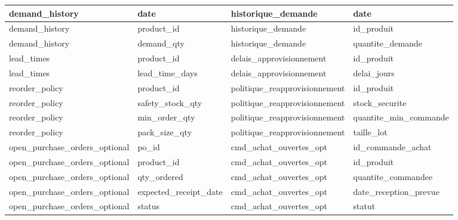 \documentclass[a4paper,11pt]{article}
\begin{document}
\begin{longtable}{|l|l|l|l|}
\rowcolor{rowgray} demand\_history & date & historique\_demande & date \\ \hline
 demand\_history & product\_id & historique\_demande & id\_produit \\ \hline
\rowcolor{rowgray} demand\_history & demand\_qty & historique\_demande & quantite\_demande \\ \hline
 lead\_times & product\_id & delais\_approvisionnement & id\_produit \\ \hline
\rowcolor{rowgray} lead\_times & lead\_time\_days & delais\_approvisionnement & delai\_jours \\ \hline
 reorder\_policy & product\_id & politique\_reapprovisionnement & id\_produit \\ \hline
\rowcolor{rowgray} reorder\_policy & safety\_stock\_qty & politique\_reapprovisionnement & stock\_securite \\ \hline
 reorder\_policy & min\_order\_qty & politique\_reapprovisionnement & quantite\_min\_commande \\ \hline
\rowcolor{rowgray} reorder\_policy & pack\_size\_qty & politique\_reapprovisionnement & taille\_lot \\ \hline
 open\_purchase\_orders\_optional & po\_id & cmd\_achat\_ouvertes\_opt & id\_commande\_achat \\ \hline
\rowcolor{rowgray} open\_purchase\_orders\_optional & product\_id & cmd\_achat\_ouvertes\_opt & id\_produit \\ \hline
 open\_purchase\_orders\_optional & qty\_ordered & cmd\_achat\_ouvertes\_opt & quantite\_commandee \\ \hline
\rowcolor{rowgray} open\_purchase\_orders\_optional & expected\_receipt\_date & cmd\_achat\_ouvertes\_opt & date\_reception\_prevue \\ \hline
 open\_purchase\_orders\_optional & status & cmd\_achat\_ouvertes\_opt & statut \\ \hline
\end{longtable}
\normalsize
\end{document}
